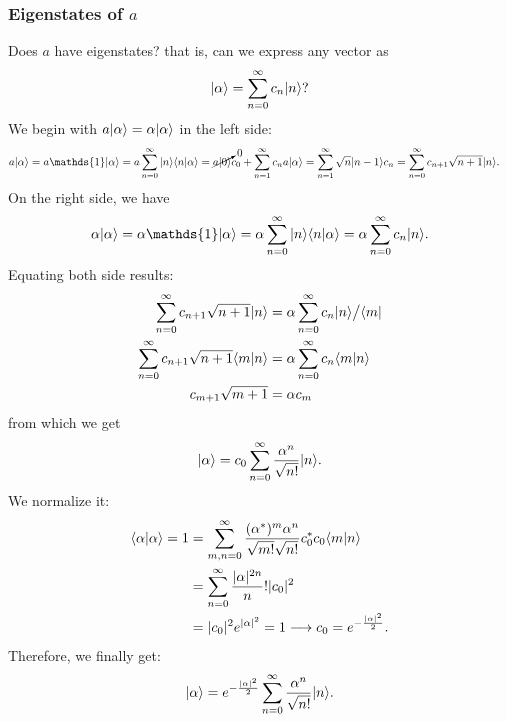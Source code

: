 \subsubsection{Eigenstates of $a$}
Does $a$ have eigenstates? that is, can we express any vector as 
\begin{align*}
    |\alpha\rangle=\sum_{n=0}^\infty c_n|n\rangle?
\end{align*}
We begin with $a|\alpha\rangle=\alpha|\alpha\rangle$ in the left side:
\begin{align*}
    a\ket{\alpha}&=a\mathds{1}\ket{\alpha}=a\sum_{n=0}^\infty\ket{n}\braket{n|\alpha}=\cancelto{0}{a\ket{0}}c_0+\sum_{n=1}^\infty c_na\ket{\alpha}=\sum_{n=1}^\infty\sqrt{n}\ket{n-1}c_n=\sum_{n=0}^\infty c_{n+1}\sqrt{n+1}\ket{n}.
\end{align*}
On the right side, we have 
\begin{align*}
    \alpha\ket{\alpha}=\alpha\mathds{1}\ket{\alpha}=\alpha\sum_{n=0}^\infty \ket{n}\braket{n|\alpha}=\alpha\sum_{n=0}^\infty c_n\ket{n}.
\end{align*}
Equating both side results:
\begin{align*}
    \sum_{n=0}^\infty c_{n+1}\sqrt{n+1}|n\rangle&=\alpha\sum_{n=0}^\infty c_n|n\rangle\bigr/\langle m|\\
    \sum_{n=0}^\infty c_{n+1}\sqrt{n+1}\langle m|n\rangle&=\alpha\sum_{n=0}^\infty c_n\langle m|n\rangle\\
    c_{m+1}\sqrt{m+1}&=\alpha c_m
\end{align*}
from which we get 
\begin{align*}
    |\alpha\rangle=c_0\sum_{n=0}^\infty \frac{\alpha^n}{\sqrt{n!}}|n\rangle.
\end{align*}
We normalize it:
\begin{align*}
    \langle\alpha|\alpha\rangle=1&=\sum_{m,n=0}^\infty \frac{(\alpha^*)^m\alpha^n}{\sqrt{m!}\sqrt{n!}}c_0^*c_0\langle m|n\rangle\\
    &=\sum_{n=0}^\infty \frac{|\alpha|^{2n}}n!|c_0|^2\\
    &=|c_0|^2e^{|\alpha|^2}=1\longrightarrow c_0=e^{-\frac{|\alpha|^2}{2}}.
\end{align*}
Therefore, we finally get:
\begin{align}
    |\alpha\rangle=e^{-\frac{|\alpha|^2}{2}}\sum_{n=0}^\infty \frac{\alpha^n}{\sqrt{n!}}|n\rangle.
\end{align}
%
